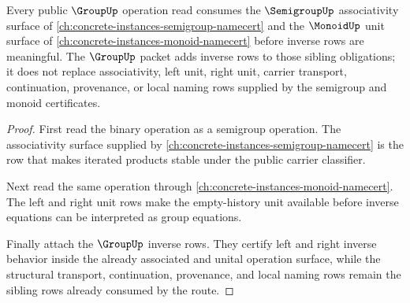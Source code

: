 \begin{theorem}
\label{thm:group-monoid-semigroup-sibling-route}
Every public $\GroupUp$ operation read consumes the $\SemigroupUp$ associativity surface of \autoref{ch:concrete-instances-semigroup-namecert} and the $\MonoidUp$ unit surface of \autoref{ch:concrete-instances-monoid-namecert} before inverse rows are meaningful. The $\GroupUp$ packet adds inverse rows to those sibling obligations; it does not replace associativity, left unit, right unit, carrier transport, continuation, provenance, or local naming rows supplied by the semigroup and monoid certificates.
\end{theorem}
\begin{proof}
First read the binary operation as a semigroup operation. The associativity surface supplied by \autoref{ch:concrete-instances-semigroup-namecert} is the row that makes iterated products stable under the public carrier classifier.

Next read the same operation through \autoref{ch:concrete-instances-monoid-namecert}. The left and right unit rows make the empty-history unit available before inverse equations can be interpreted as group equations.

Finally attach the $\GroupUp$ inverse rows. They certify left and right inverse behavior inside the already associated and unital operation surface, while the structural transport, continuation, provenance, and local naming rows remain the sibling rows already consumed by the route.
\end{proof}

